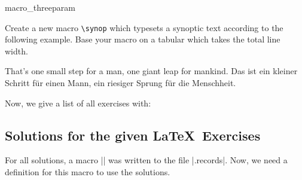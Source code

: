 \begin{dispExample}
\begin{texercise}{macro_threeparam}
\begin{tcboutputlisting}
\newcommand{\synop}[3]{%
  \begin{tabular}{@{}p{(\linewidth-\tabcolsep*2-\arrayrulewidth)/2}|%
    p{(\linewidth-\tabcolsep*2-\arrayrulewidth)/2}@{}}\hline
  \multicolumn{2}{c}{\bfseries #1}\\\hline
  \multicolumn{1}{c|}{\itshape English}&
  \multicolumn{1}{c}{\itshape German}\\\hline
  #2 & #3
  \end{tabular}}
\end{tcboutputlisting}
\tcbuselistingtext%
Create a new macro \verb+\synop+ which typesets a synoptic text according
to the following example. Base your macro on a tabular which takes the
total line width.\par\smallskip
\begin{tcbwritetemp}
%
{That's one small step for a man, one giant leap for mankind.}%
{Das ist ein kleiner Schritt f\"{u}r einen Mann,
   ein riesiger Sprung f\"{u}r die Menschheit.}
\end{tcbwritetemp}
\tcbusetemplisting\par\smallskip\tcbusetemp%
\end{texercise}
\end{dispExample}

\begin{dispListing}
\tcbstoprecording
\end{dispListing}
\tcbusetemp

\bigskip

Now, we give a list of all exercises with:

\begin{dispListing}
\end{dispListing}
\tcbusetemp

\clearpage
\subsection{Solutions for the given \LaTeX\ Exercises}

For all solutions, a macro |\processsol| was written to the file |\jobname.records|.
Now, we need a definition for this macro to use the solutions.

